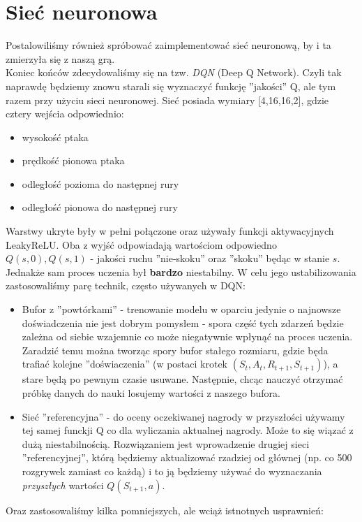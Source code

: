 \documentclass[12pt, A4]{article}
\begin{document}
\section{Sieć neuronowa}
Postalowiliśmy również spróbować zaimplementować sieć neuronową, by i ta zmierzyła się z naszą grą. \\
	Koniec końców zdecydowaliśmy się na tzw. \textit{DQN} (Deep Q Network). Czyli tak naprawdę będziemy znowu starali się wyznaczyć funkcję ''jakości'' Q, ale tym razem przy użyciu sieci neuronowej.
	Sieć posiada wymiary [4,16,16,2], gdzie cztery wejścia odpowiednio:
	\begin{itemize}
	\item wysokość ptaka
	\item prędkość pionowa ptaka
	\item odległość pozioma do następnej rury
	\item odległość pionowa do następnej rury
	\end{itemize}
	Warstwy ukryte były w pełni połączone oraz używały funkcji aktywacyjnych LeakyReLU. Oba z wyjść odpowiadają wartościom odpowiedno $Q(s, 0), Q(s, 1)$ - jakości ruchu ''nie-skoku'' oraz ''skoku'' będąc w stanie $s$. \\
	Jednakże sam proces uczenia był \textbf{bardzo} niestabilny. W celu jego ustabilizowania zastosowaliśmy parę technik, często używanych w DQN:
	\begin{itemize}
	\item Bufor z ''powtórkami'' - trenowanie modelu w oparciu jedynie o najnowsze doświadczenia nie jest dobrym pomysłem - spora część tych zdarzeń będzie zależna od siebie wzajemnie co może niegatywnie wpłynąć na proces uczenia. Zaradzić temu można tworząc spory bufor stałego rozmiaru, gdzie będa trafiać kolejne ''doświaczenia'' (w postaci krotek $(S_t, A_t, R_{t+1}, S_{t+1})$), a stare będą po pewnym czasie usuwane. Następnie, chcąc nauczyć otrzymać próbkę danych do nauki losujemy wartości z naszego bufora.
	\item Sieć ''referencyjna'' - do oceny oczekiwanej nagrody w przyszłości używamy tej samej funckji Q co dla wyliczania aktualnej nagrody. Może to się wiązać z dużą niestabilnością. Rozwiązaniem jest wprowadzenie drugiej sieci ''referencyjnej'', którą będziemy aktualizować rzadziej od głównej (np. co 500 rozgrywek zamiast co każdą) i to ją będziemy używać do wyznaczania \textit{przyszłych} wartości $Q(S_{t+1}, a)$.  
	\end{itemize}
	Oraz zastosowaliśmy kilka pomniejszych, ale wciąż istnotnych usprawnień:
\end{document}
